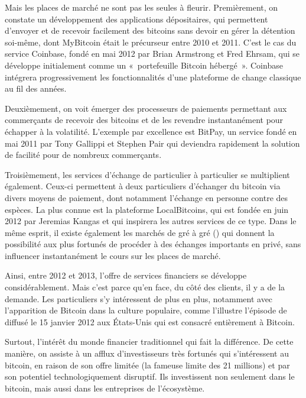 Mais les places de marché ne sont pas les seules à fleurir. Premièrement, on constate un développement des applications dépositaires, qui permettent d'envoyer et de recevoir facilement des bitcoins sans devoir en gérer la détention soi-même, dont MyBitcoin était le précurseur entre 2010 et 2011. C'est le cas du service Coinbase, fondé en mai 2012 par Brian Armstrong et Fred Ehrsam, qui se développe initialement comme un «~portefeuille Bitcoin hébergé~». Coinbase intégrera progressivement les fonctionnalités d'une plateforme de change classique au fil des années.

Deuxièmement, on voit émerger des processeurs de paiements permettant aux commerçants de recevoir des bitcoins et de les revendre instantanément pour échapper à la volatilité. L'exemple par excellence est BitPay, un service fondé en mai 2011 par Tony Gallippi et Stephen Pair qui deviendra rapidement la solution de facilité pour de nombreux commerçants.

Troisièmement, les services d'échange de particulier à particulier se multiplient également. Ceux-ci permettent à deux particuliers d'échanger du bitcoin via divers moyens de paiement, dont notamment l'échange en personne contre des espèces. La plus connue est la plateforme LocalBitcoins, qui est fondée en juin 2012 par Jeremias Kangas et qui inspirera les autres services de ce type. Dans le même esprit, il existe également les marchés de gré à gré () qui donnent la possibilité aux plus fortunés de procéder à des échanges importants en privé, sans influencer instantanément le cours sur les places de marché.

Ainsi, entre 2012 et 2013, l'offre de services financiers se développe considérablement. Mais c'est parce qu'en face, du côté des clients, il y a de la demande. Les particuliers s'y intéressent de plus en plus, notamment avec l'apparition de Bitcoin dans la culture populaire, comme l'illustre l'épisode de  diffusé le 15 janvier 2012 aux États-Unis qui est consacré entièrement à Bitcoin.

Surtout, l'intérêt du monde financier traditionnel qui fait la différence. De cette manière, on assiste à un afflux d'investisseurs très fortunés qui s'intéressent au bitcoin, en raison de son offre limitée (la fameuse limite des 21 millions) et par son potentiel technologiquement disruptif. Ils investissent non seulement dans le bitcoin, mais aussi dans les entreprises de l'écosystème. 

